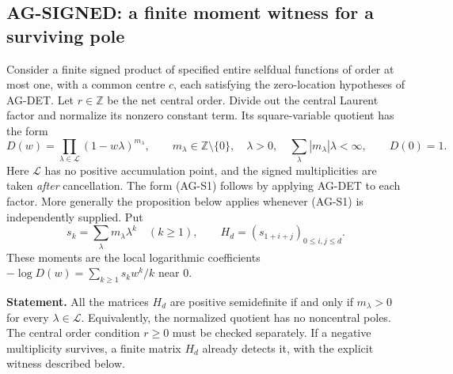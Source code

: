 \subsection{AG-SIGNED: a finite moment witness for a surviving pole}
\label{ag:signed}

Consider a finite signed product of specified entire selfdual functions
of order at most one, with a common centre $c$, each satisfying the
zero-location hypotheses of AG-DET. Let $r\in\mathbb Z$ be the net
central order. Divide out the central Laurent factor and normalize its
nonzero constant term. Its square-variable quotient has the form
\[
 D(w)=\prod_{\lambda\in\mathcal L}(1-w\lambda)^{m_\lambda},
 \qquad m_\lambda\in\mathbb Z\setminus\{0\},\quad
 \lambda>0,\quad \sum_\lambda |m_\lambda|\lambda<\infty,
 \qquad D(0)=1.                                      \tag{AG-S1}
\]
Here $\mathcal L$ has no positive accumulation point, and the signed
multiplicities are taken \emph{after} cancellation. The form (AG-S1)
follows by applying AG-DET to each factor. More generally the proposition
below applies whenever (AG-S1) is independently supplied. Put
\[
 s_k=\sum_\lambda m_\lambda\lambda^k\quad(k\ge1),\qquad
 H_d=(s_{1+i+j})_{0\le i,j\le d}.
\]
These moments are the local logarithmic coefficients
$-\log D(w)=\sum_{k\ge1}s_kw^k/k$ near $0$.

\textbf{Statement.} All the matrices $H_d$ are positive semidefinite
if and only if $m_\lambda>0$ for every $\lambda\in\mathcal L$.
Equivalently, the normalized quotient has no noncentral poles. The
central order condition $r\ge0$ must be checked separately. If a
negative multiplicity survives, a finite matrix $H_d$ already detects it,
with the explicit witness described below.

